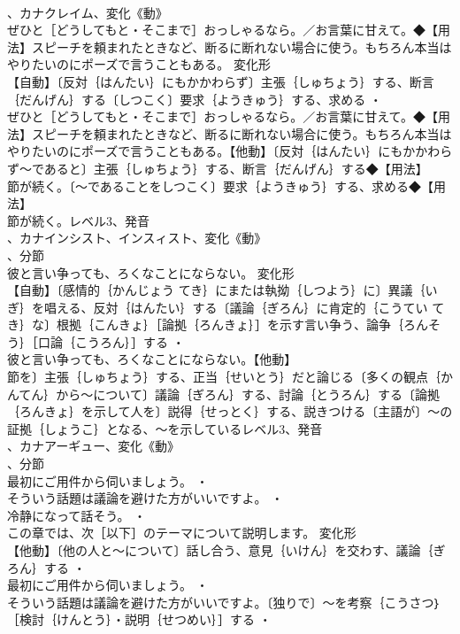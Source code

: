 \documentclass[8pt]{extreport}
\begin{document}
\begin{CJK}{UTF8}{min}
\\	、カナクレイム、変化《動》
\\	ぜひと［どうしてもと・そこまで］おっしゃるなら。／お言葉に甘えて。◆【用法】スピーチを頼まれたときなど、断るに断れない場合に使う。もちろん本当はやりたいのにポーズで言うこともある。	変化形 
\\	【自動】〔反対｛はんたい｝にもかかわらず〕主張｛しゅちょう｝する、断言｛だんげん｝する〔しつこく〕要求｛ようきゅう｝する、求める ・
\\	ぜひと［どうしてもと・そこまで］おっしゃるなら。／お言葉に甘えて。◆【用法】スピーチを頼まれたときなど、断るに断れない場合に使う。もちろん本当はやりたいのにポーズで言うこともある。【他動】〔反対｛はんたい｝にもかかわらず～であると〕主張｛しゅちょう｝する、断言｛だんげん｝する◆【用法】
\\	節が続く。〔～であることをしつこく〕要求｛ようきゅう｝する、求める◆【用法】
\\	節が続く。レベル3、発音
\\	、カナインシスト、インスィスト、変化《動》
\\	、分節
\\	彼と言い争っても、ろくなことにならない。	変化形 
\\	【自動】〔感情的｛かんじょう てき｝にまたは執拗｛しつよう｝に〕異議｛いぎ｝を唱える、反対｛はんたい｝する〔議論｛ぎろん｝に肯定的｛こうてい てき｝な〕根拠｛こんきょ｝［論拠｛ろんきょ｝］を示す言い争う、論争｛ろんそう｝［口論｛こうろん｝］する ・
\\	彼と言い争っても、ろくなことにならない。【他動】
\\	節を〕主張｛しゅちょう｝する、正当｛せいとう｝だと論じる〔多くの観点｛かんてん｝から～について〕議論｛ぎろん｝する、討論｛とうろん｝する〔論拠｛ろんきょ｝を示して人を〕説得｛せっとく｝する、説きつける〔主語が〕～の証拠｛しょうこ｝となる、～を示しているレベル3、発音
\\	、カナアーギュー、変化《動》
\\	、分節
\\	最初にご用件から伺いましょう。 ・
\\	そういう話題は議論を避けた方がいいですよ。 ・
\\	冷静になって話そう。 ・
\\	この章では、次［以下］のテーマについて説明します。	変化形 
\\	【他動】〔他の人と～について〕話し合う、意見｛いけん｝を交わす、議論｛ぎろん｝する ・
\\	最初にご用件から伺いましょう。 ・
\\	そういう話題は議論を避けた方がいいですよ。〔独りで〕～を考察｛こうさつ｝［検討｛けんとう｝・説明｛せつめい｝］する ・

\end{CJK}
\end{document}
